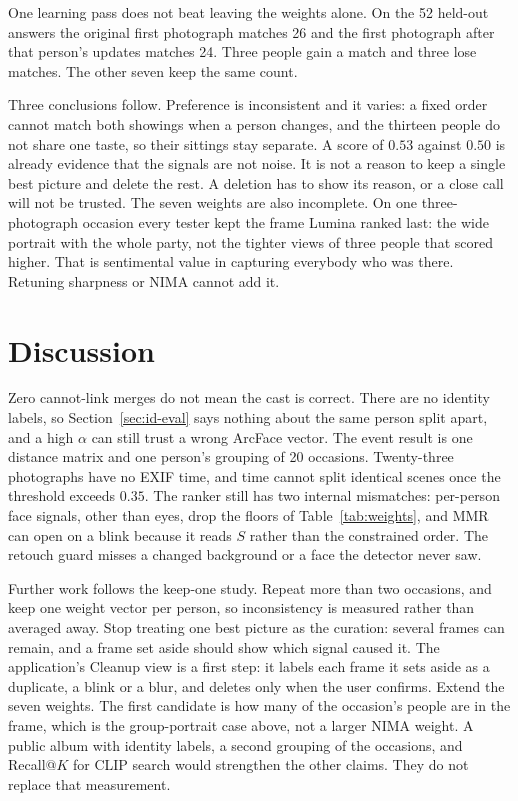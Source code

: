 \documentclass[conference]{IEEEtran}
\begin{document}
One learning pass does not beat leaving the weights alone. On the 52 held-out
answers the original first photograph matches 26 and the first photograph
after that person's updates matches 24. Three people gain a match and three
lose matches. The other seven keep the same count.

Three conclusions follow. Preference is inconsistent and it varies: a fixed
order cannot match both showings when a person changes, and the thirteen people
do not share one taste, so their sittings stay separate. A score of $0.53$
against $0.50$ is already evidence that the signals are not noise. It is not
a reason to keep a single best picture and delete the rest. A deletion has to
show its reason, or a close call will not be trusted. The seven weights are
also incomplete. On one three-photograph occasion every tester kept the frame
Lumina ranked last: the wide portrait with the whole party, not the tighter
views of three people that scored higher. That is sentimental value in
capturing everybody who was there. Retuning sharpness or NIMA cannot add it.

\section{Discussion}
\label{sec:discuss}

Zero cannot-link merges do not mean the cast is correct. There are no identity
labels, so Section~\ref{sec:id-eval} says nothing about the same person split
apart, and a high $\alpha$ can still trust a wrong ArcFace vector. The event
result is one distance matrix and one person's grouping of 20 occasions.
Twenty-three photographs have no EXIF time, and time cannot split identical
scenes once the threshold exceeds $0.35$. The ranker still has two internal
mismatches: per-person face signals, other than eyes, drop the floors of
Table~\ref{tab:weights}, and MMR can open on a blink because it reads $S$
rather than the constrained order. The retouch guard misses a changed
background or a face the detector never saw.

Further work follows the keep-one study. Repeat more than two occasions, and
keep one weight vector per person, so inconsistency is measured rather than
averaged away. Stop treating one best picture as the curation: several frames
can remain, and a frame set aside should show which signal caused it. The
application's Cleanup view is a first step: it labels each frame it sets aside
as a duplicate, a blink or a blur, and deletes only when the user confirms. Extend
the seven weights. The first candidate is how many of the occasion's people
are in the frame, which is the group-portrait case above, not a larger NIMA
weight. A public album with identity labels, a second grouping of the
occasions, and Recall@$K$ for CLIP search would strengthen the other claims.
They do not replace that measurement.
\end{document}
